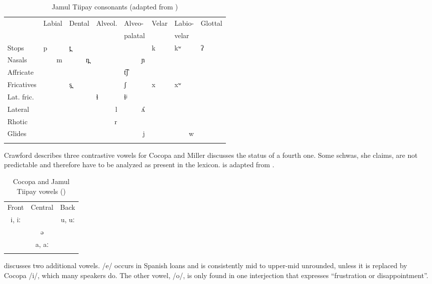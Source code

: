 \documentclass[output=paper,colorlinks,citecolor=brown]{langscibook}
\begin{document}
\begin{table}
\small
\caption{Jamul Tiipay consonants (adapted from \cite[39]{Miller2001})}
\label{tab:Kramer:2}
\begin{tabular}{l *7{l}} 
\lsptoprule
& Labial & Dental & Alveol. & Alveo- & Velar & Labio- & Glottal\\
&        &        &         & palatal &      & velar  & \\\midrule
{Stops} & {p} & {t̪} &  &  & {k} & {kʷ} & {ʔ}\\
{Nasals} & \multicolumn{1}{r}{m} & \multicolumn{1}{r}{n̪} &  & \multicolumn{1}{r}{ɲ} &  &  & \\
{Affricate} &  &  &  & {t͡ʃ} &  &  & \\
{Fricatives} &  & {s̪} &  & {ʃ} & {x} & {xʷ} & \\
{Lat. fric.} &  &  & {ɬ} & {ɬʲ} &  &  & \\
{Lateral} &  &  & \multicolumn{1}{r}{l} & \multicolumn{1}{r}{ʎ} &  &  & \\
{Rhotic} &  &  & \multicolumn{1}{r}{r} &  &  &  & \\
{Glides} &  &  &  & \multicolumn{1}{r}{j} &  & \multicolumn{1}{r}{w} & \\
\lspbottomrule
\end{tabular}
\end{table}

Crawford describes three contrastive vowels for Cocopa and Miller discusses the status of a fourth one. Some schwas, she claims, are not predictable and therefore have to be analyzed as present in the lexicon.  is adapted from \citet[12]{Miller2001}.

\begin{table}
\caption{Cocopa and Jamul Tiipay vowels (\citealt{Crawford1966,Miller2001})}
\label{tab:Kramer:3}
\begin{tabular}{ccc}  
\lsptoprule
{Front} & {Central} & {Back}\\
{i, iː} &         & {u, uː}\\
        & {ə}     & \\
        & {a, aː} & \\
\lspbottomrule
\end{tabular}
\end{table}


\citet[13]{Crawford1966} discusses two additional vowels. /e/ occurs in Spanish loans and is consistently mid to upper-mid unrounded, unless it is replaced by Cocopa /i/, which many speakers do. The other vowel, /o/, is only found in one interjection that expresses “frustration or disappointment”. 
\end{document}
